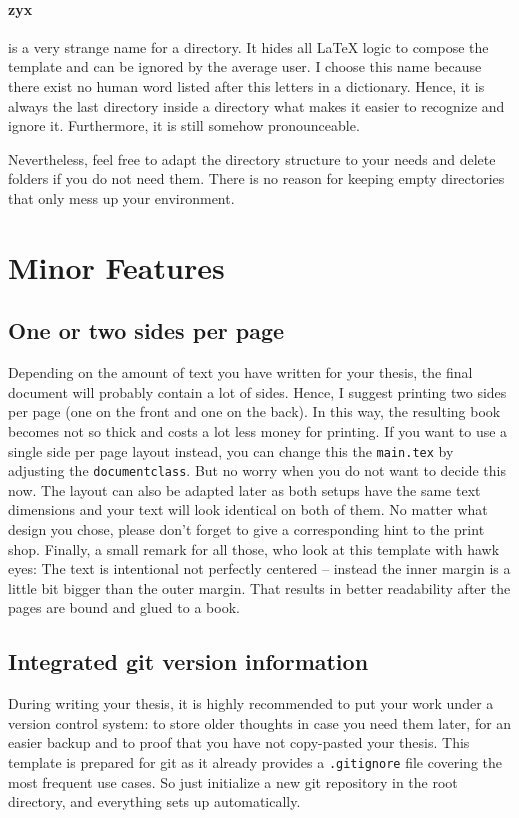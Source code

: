 \documentclass[\myrootdir/main.tex]{subfiles}
\begin{document}
\paragraph{zyx} is a very strange name for a directory.
It hides all LaTeX logic to compose the template and can be ignored by the average user.
I choose this name because there exist no human word listed after this letters in a dictionary.
Hence, it is always the last directory inside a directory what makes it easier to recognize and ignore it.
Furthermore, it is still somehow pronounceable.

\vfill
\newpage

Nevertheless, feel free to adapt the directory structure to your needs and delete folders if you do not need them.
There is no reason for keeping empty directories that only mess up your environment.

\section{Minor Features}

\subsection{One or two sides per page}
Depending on the amount of text you have written for your thesis, the final document will probably contain a lot of sides.
Hence, I suggest printing two sides per page (one on the front and one on the back).
In this way, the resulting book becomes not so thick and costs a lot less money for printing.
If you want to use a single side per page layout instead, you can change this the \texttt{main.tex} by adjusting the \texttt{documentclass}.
But no worry when you do not want to decide this now.
The layout can also be adapted later as both setups have the same text dimensions and your text will look identical on both of them.
No matter what design you chose, please don't forget to give a corresponding hint to the print shop.
Finally, a small remark for all those, who look at this template with hawk eyes:
The text is intentional not perfectly centered -- instead the inner margin is a little bit bigger than the outer margin.
That results in better readability after the pages are bound and glued to a book.

\subsection{Integrated git version information}
During writing your thesis, it is highly recommended to put your work under a version control system: to store older thoughts in case you need them later, for an easier backup and to proof that you have not copy-pasted your thesis.
This template is prepared for git as it already provides a \texttt{.gitignore} file covering the most frequent use cases.
So just initialize a new git repository in the root directory, and everything sets up automatically.
\end{document}

